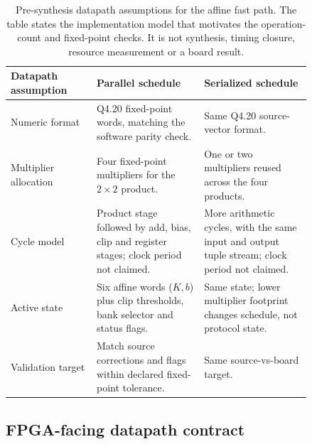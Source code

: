 \documentclass[11pt]{article}
\begin{document}
\begin{table}[htbp]
\centering
\small
\begin{tabular}{@{}>{\raggedright\arraybackslash}p{0.24\linewidth}>{\raggedright\arraybackslash}p{0.30\linewidth}>{\raggedright\arraybackslash}p{0.30\linewidth}@{}}
\toprule
Datapath assumption & Parallel schedule & Serialized schedule \\
\midrule
Numeric format & Q4.20 fixed-point words, matching the software parity check. &
Same Q4.20 source-vector format. \\
\addlinespace
Multiplier allocation & Four fixed-point multipliers for the \(2\times2\)
product. & One or two multipliers reused across the four products. \\
\addlinespace
Cycle model & Product stage followed by add, bias, clip and register stages;
clock period not claimed. & More arithmetic cycles, with the same input and
output tuple stream; clock period not claimed. \\
\addlinespace
Active state & Six affine words (\(K,b\)) plus clip thresholds, bank selector
and status flags. & Same state; lower multiplier footprint changes schedule,
not protocol state. \\
\addlinespace
Validation target & Match source corrections and flags within declared
fixed-point tolerance. & Same source-vs-board target. \\
\bottomrule
\end{tabular}
\caption{Pre-synthesis datapath assumptions for the affine fast path.  The
table states the implementation model that motivates the operation-count and
fixed-point checks.  It is not synthesis, timing closure, resource measurement
or a board result.}
\label{tab:presynthesis-datapath-assumptions}
\end{table}

\subsection{FPGA-facing datapath contract}
\end{document}
